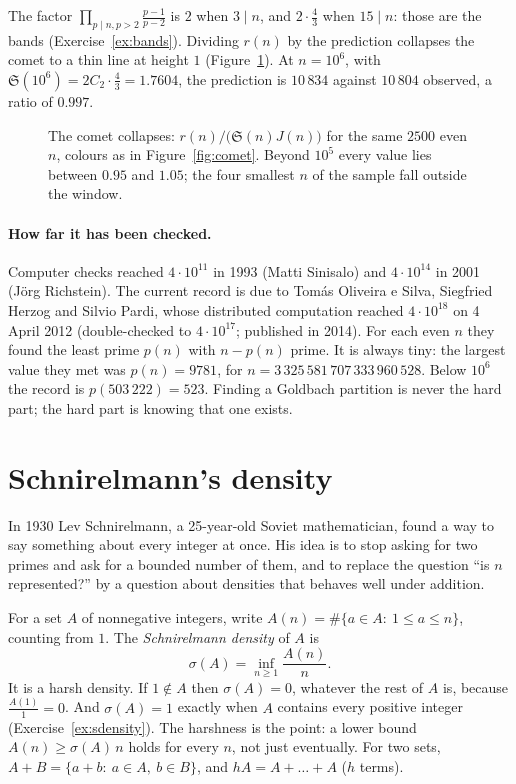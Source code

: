 The factor $\prod_{p\mid n,p>2}\frac{p-1}{p-2}$ is $2$ when $3\mid n$, and $2\cdot\frac43$ when $15\mid n$: those are the bands (Exercise~\ref{ex:bands}).
Dividing $r(n)$ by the prediction collapses the comet to a thin line at height $1$ (Figure~\ref{fig:normalised}). At $n=10^6$, with
$\mathfrak S(10^6)=2C_2\cdot\frac43=1.7604$, the prediction is $10\,834$ against $10\,804$ observed, a ratio of $0.997$.

\begin{figure}[ht]
\centering
{}
\caption{The comet collapses: $r(n)/\bigl(\mathfrak S(n)J(n)\bigr)$ for the same $2500$ even $n$, colours as in Figure~\ref{fig:comet}. Beyond $10^5$ every
value lies between $0.95$ and $1.05$; the four smallest $n$ of the sample fall outside the window.}
\label{fig:normalised}
\end{figure}

\paragraph{How far it has been checked.} Computer checks reached $4\cdot10^{11}$ in 1993 (Matti Sinisalo) and $4\cdot10^{14}$ in 2001 (J\"org Richstein). The current record is due to Tom\'as
Oliveira e Silva, Siegfried Herzog and Silvio Pardi, whose distributed computation reached $4\cdot10^{18}$ on 4 April 2012 (double-checked to
$4\cdot10^{17}$; published in 2014). For each even $n$ they found the least prime $p(n)$ with $n-p(n)$ prime. It is always tiny: the largest value they
met was $p(n)=9781$, for $n=3\,325\,581\,707\,333\,960\,528$. Below $10^6$ the record is $p(503\,222)=523$. Finding a Goldbach partition is never the
hard part; the hard part is knowing that one exists.

\section{Schnirelmann's density}

In 1930 Lev Schnirelmann, a 25-year-old Soviet mathematician, found a way to say something about every integer at once. His idea is to stop
asking for two primes and ask for a bounded number of them, and to replace the question ``is $n$ represented?'' by a question about densities that
behaves well under addition.

For a set $A$ of nonnegative integers, write $A(n)=\#\{a\in A:\ 1\le a\le n\}$, counting from $1$. The \emph{Schnirelmann density} of $A$ is
\[
\sigma(A)=\inf_{n\ge1}\frac{A(n)}n.
\]
It is a harsh density. If $1\notin A$ then $\sigma(A)=0$, whatever the rest of $A$ is, because $\frac{A(1)}1=0$. And $\sigma(A)=1$ exactly when $A$ contains every
positive integer (Exercise~\ref{ex:sdensity}). The harshness is the point: a lower bound $A(n)\ge\sigma(A)\,n$ holds for every $n$, not just eventually.
For two sets, $A+B=\{a+b:\ a\in A,\ b\in B\}$, and $hA=A+\dots+A$ ($h$ terms).

